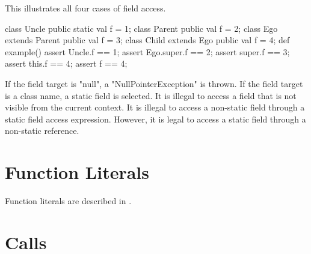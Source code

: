 \begin{ex}
This illustrates all four cases of field access.
\begin{xten}
class Uncle {
  public static val f = 1;
}
class Parent {
  public val f = 2;
}
class Ego extends Parent {
  public val f = 3;
  class Child extends Ego {
     public val f = 4;
     def example() { 
        assert Uncle.f == 1; 
        assert Ego.super.f == 2;
        assert super.f == 3;
        assert this.f == 4;
        assert f == 4;
     }
  }
}
\end{xten}
\end{ex}

If the field target is \xcd"null", a \xcd"NullPointerException"
is thrown.
If the field target is a class name, a static field is selected.
It is illegal to access  a field that is not visible from
the current context.
It is illegal to access a non-static field
through a static field access expression.  However, it is legal to access a
static field through a non-static reference.

\section{Function Literals}
Function literals are described in .

\section{Calls}
\label{Call}
\label{MethodInvocation}
\label{MethodInvocationSubstitution}

